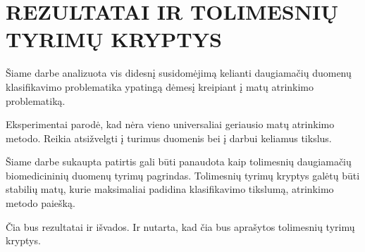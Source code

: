 
\section*{REZULTATAI IR TOLIMESNIŲ TYRIMŲ KRYPTYS}

Šiame darbe analizuota vis didesnį susidomėjimą kelianti daugiamačių duomenų klasifikavimo problematika ypatingą dėmesį kreipiant į matų atrinkimo problematiką. 

Eksperimentai parodė, kad nėra vieno universaliai geriausio matų atrinkimo metodo. Reikia atsižvelgti į turimus duomenis bei į darbui keliamus tikslus.

Šiame darbe sukaupta patirtis gali būti panaudota kaip tolimesnių daugiamačių biomedicininių duomenų tyrimų pagrindas. Tolimesnių tyrimų kryptys galėtų būti stabilių matų, kurie maksimaliai padidina klasifikavimo tikslumą, atrinkimo metodo paiešką.

Čia bus rezultatai ir išvados. Ir nutarta, kad čia bus aprašytos tolimesnių tyrimų kryptys.